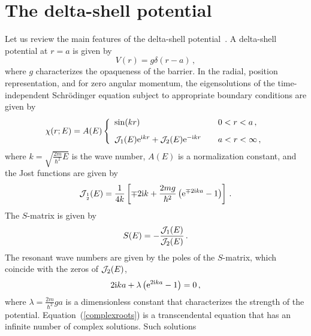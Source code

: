 \documentclass[12pt]{article}
\newcommand{\rmi}{{\rm i}}
\newcommand{\rme}{{\rm e}}
\begin{document}
 


\section{The delta-shell potential}
\setcounter{equation}{0}
\label{sec:review}


Let us review the main features of the delta-shell 
potential~\cite{GOTTFRIED}.
A delta-shell potential at $r=a$ is given by
\begin{equation}
       V(r)=g\delta (r-a) \, ,
	\label{deltap}
\end{equation}
where $g$ characterizes the opaqueness of the barrier. In the
radial, position representation, and for zero angular momentum, 
the eigensolutions of the time-independent Schr\"odinger equation 
subject to appropriate boundary conditions are given by
\begin{equation}
       \chi (r;E)=A(E) \left\{ \begin{array}{ll}
        \sin (kr) \quad  & 0<r<a \, , \\ [2ex]
        {\cal J}_1(E) \rme ^{\rmi kr} + {\cal J}_2(E) \rme ^{-\rmi kr}        
     \quad &  a<r<\infty \, , 
        \end{array} 
      \right. 
	\label{0-}
\end{equation}
where $k=\sqrt{\frac{2m}{\hbar ^2}E}$ is the wave number,
$A(E)$ is a normalization constant, and the Jost functions are given by
\begin{equation}
       {\cal J}_{{\,}_{2}^{1}}(E)   = \frac{1}{4k} \left[ \mp 
                       2\rmi k + \frac{2mg}{\hbar ^2} 
                        \left( \rme ^{\mp 2\rmi ka} -1\right) \right] \, .
               \label{j1a2}  
\end{equation}
The $S$-matrix is given by
\begin{equation}
      S(E)=-\frac{ {\cal J}_1(E)}{{\cal J}_2(E)}  \, .
\end{equation}
The resonant wave numbers are given by the poles of the $S$-matrix, 
which coincide with the zeros of ${\cal J}_2(E)$,
\begin{equation}
       2\rmi k a + \lambda 
                        \left( \rme ^{2\rmi k a} -1\right) =0 \, ,
       \label{complexroots}
\end{equation}
where $\lambda = \frac{2m}{\hbar ^2}ga$ is a dimensionless
constant that characterizes the strength of the 
potential. Equation~(\ref{complexroots}) is a transcendental equation
that has an infinite number of complex solutions. Such solutions
\end{document}
